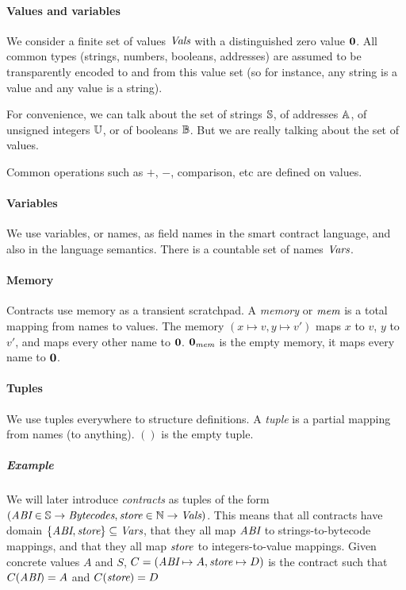 \documentclass[12pt]{extarticle}
\begin{document}
\paragraph{Values and variables}
We consider a finite set of values $\textit{Vals}$ with a distinguished zero value $\mathbf{0}$. All common types (strings, numbers, booleans, addresses) are assumed to be transparently encoded to and from this value set (so for instance, any string is a value and any value is a string).

For convenience, we can talk about the set of strings $\mathbb{S}$, of addresses $\mathbb{A}$, of unsigned integers $\mathbb{U}$, or of booleans $\mathbb{B}$. But we are really talking about the set of values.

Common operations such as $+$, $-$, comparison, etc are defined on values.

\paragraph{Variables}
We use variables, or names, as field names in the smart contract language, and also in the language semantics. There is a countable set of names $\textit{Vars}$. 

\paragraph{Memory}
Contracts use memory as a transient scratchpad.
A \emph{memory} or $\textit{mem}$ is a total mapping from names to values. The memory $(x\mapsto v,y\mapsto v')$ maps $x$ to $v$, $y$ to $v'$, and maps every other name to $\mathbf{0}$. $\mathbf{0}_{\textit{mem}}$ is the empty memory, it maps every name to $\mathbf{0}$.

\paragraph{Tuples}
We use tuples everywhere to structure definitions. A \emph{tuple} is a partial mapping from names (to anything). $()$ is the empty tuple.

\subparagraph{Example} 
We will later introduce \emph{contracts} as tuples of the form $(\textit{ABI}\in\mathbb{S}\rightarrow\textit{Bytecodes},\textit{store}\in\mathbb{N}\rightarrow\textit{Vals})$. 
This means that all contracts have domain $\left\{\textit{ABI},\textit{store}\right\}\subseteq\textit{Vars}$, that they all map $\textit{ABI}$ to strings-to-bytecode mappings, and that they all map $\textit{store}$ to integers-to-value mappings.
Given concrete values $A$ and $S$, $C = (\textit{ABI}\mapsto A,\textit{store}\mapsto D)$ is the contract such that $C(\textit{ABI}) = A$ and $C(\textit{store}) = D$
\end{document}

